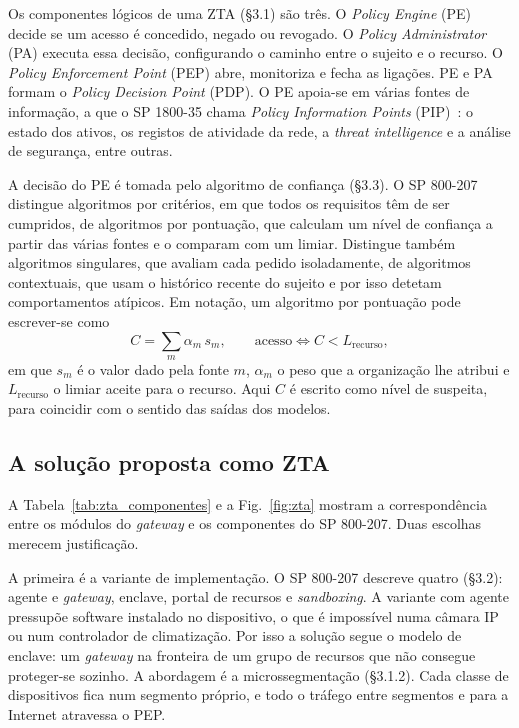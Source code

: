 \documentclass[conference,a4paper]{IEEEtran}
\begin{document}
Os componentes lógicos de uma ZTA (§3.1) são três. O \textit{Policy Engine} (PE)
decide se um acesso é concedido, negado ou revogado. O \textit{Policy Administrator}
(PA) executa essa decisão, configurando o caminho entre o sujeito e o recurso. O
\textit{Policy Enforcement Point} (PEP) abre, monitoriza e fecha as ligações. PE e PA
formam o \textit{Policy Decision Point} (PDP). O PE apoia-se em várias fontes de
informação, a que o SP 1800-35 chama \textit{Policy Information Points}
(PIP)~\cite{nccoe2025zta}: o estado dos ativos, os registos de atividade da rede, a
\textit{threat intelligence} e a análise de segurança, entre outras.

A decisão do PE é tomada pelo algoritmo de confiança (§3.3). O SP 800-207 distingue
algoritmos por critérios, em que todos os requisitos têm de ser cumpridos, de
algoritmos por pontuação, que calculam um nível de confiança a partir das várias fontes
e o comparam com um limiar. Distingue também algoritmos singulares, que avaliam cada
pedido isoladamente, de algoritmos contextuais, que usam o histórico recente do sujeito
e por isso detetam comportamentos atípicos. Em notação, um algoritmo por pontuação pode
escrever-se como
\begin{equation}
C = \sum_{m} \alpha_m\, s_m, \qquad
\text{acesso} \iff C < L_{\text{recurso}},
\label{eq:zta_score}
\end{equation}
em que $s_m$ é o valor dado pela fonte $m$, $\alpha_m$ o peso que a organização lhe atribui e
$L_{\text{recurso}}$ o limiar aceite para o recurso. Aqui $C$ é escrito como nível de
suspeita, para coincidir com o sentido das saídas dos modelos.

\subsection{A solução proposta como ZTA}
A Tabela~\ref{tab:zta_componentes} e a Fig.~\ref{fig:zta} mostram a correspondência
entre os módulos do \textit{gateway} e os componentes do SP 800-207. Duas escolhas
merecem justificação.

A primeira é a variante de implementação. O SP 800-207 descreve quatro (§3.2):
agente e \textit{gateway}, enclave, portal de recursos e \textit{sandboxing}. A
variante com agente pressupõe software instalado no dispositivo, o que é impossível
numa câmara IP ou num controlador de climatização. Por isso a solução segue o modelo de
enclave: um \textit{gateway} na fronteira de um grupo de recursos que não consegue
proteger-se sozinho. A abordagem é a microssegmentação (§3.1.2). Cada classe de
dispositivos fica num segmento próprio, e todo o tráfego entre segmentos e para a
Internet atravessa o PEP.
\end{document}

